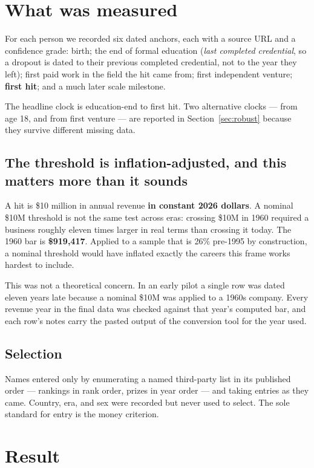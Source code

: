 \documentclass[11pt]{article}
\begin{document}
\section{What was measured}

For each person we recorded six dated anchors, each with a source URL and a
confidence grade: birth; the end of formal education (\emph{last completed
credential}, so a dropout is dated to their previous completed credential, not
to the year they left); first paid work in the field the hit came from; first
independent venture; \textbf{first hit}; and a much later scale milestone.

The headline clock is education-end to first hit. Two alternative clocks --- from
age 18, and from first venture --- are reported in Section~\ref{sec:robust}
because they survive different missing data.

\subsection{The threshold is inflation-adjusted, and this matters more than it sounds}

A hit is \$10 million in annual revenue \textbf{in constant 2026 dollars}. A
nominal \$10M threshold is not the same test across eras: crossing \$10M in 1960
required a business roughly eleven times larger in real terms than crossing it
today. The 1960 bar is \textbf{\$919{,}417}. Applied to a sample that is 26\%
pre-1995 by construction, a nominal threshold would have inflated exactly the
careers this frame works hardest to include.

This was not a theoretical concern. In an early pilot a single row was dated
eleven years late because a nominal \$10M was applied to a 1960s company. Every
revenue year in the final data was checked against that year's computed bar, and
each row's notes carry the pasted output of the conversion tool for the year
used.

\subsection{Selection}

Names entered only by enumerating a named third-party list in its published
order --- rankings in rank order, prizes in year order --- and taking entries as
they came. Country, era, and sex were recorded but never used to select. The
sole standard for entry is the money criterion.

\section{Result}
\end{document}
